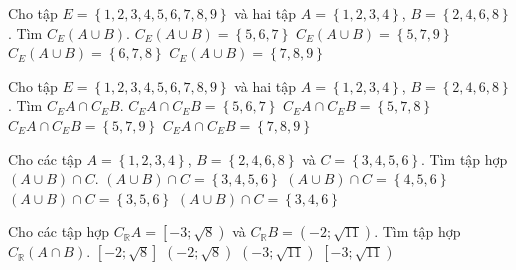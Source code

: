 \begin{ex}%
	Cho tập $E=\left\{1,2,3,4,5,6,7,8,9\right\}$ và hai tập $A=\left\{1,2,3,4\right\}$, $B=\left\{2,4,6,8\right\}$. Tìm $C_E \left(A\cup B\right)$.
	\choice
	{$C_E \left(A\cup B\right)=\left\{5,6,7\right\} $}
	{\True$C_E \left(A\cup B\right)=\left\{5,7,9\right\} $}
	{$C_E \left(A\cup B\right)=\left\{6,7,8\right\} $}
	{$C_E \left(A\cup B\right)=\left\{7,8,9\right\} $}
\end{ex}

\begin{ex}%
	Cho tập $E=\left\{1,2,3,4,5,6,7,8,9\right\}$ và hai tập $A=\left\{1,2,3,4\right\}$, $B=\left\{2,4,6,8\right\}$. Tìm $C_E A\cap C_EB$.	
	\choice
	{$C_E A\cap C_EB=\left\{5,6,7\right\}$}
	{$C_E A\cap C_EB=\left\{5,7,8\right\}$}
	{\True$C_E A\cap C_EB=\left\{5,7,9\right\}$}
	{$C_E A\cap C_EB=\left\{7,8,9\right\}$}
\end{ex}

\begin{ex}%
	Cho các tập $A=\left\{1,2,3,4\right\}$, $B=\left\{2,4,6,8\right\}$ và $C=\left\{3,4,5,6\right\}$. Tìm tập hợp $\left(A\cup B\right)\cap C$.
	\choice
	{$\left(A\cup B\right)\cap C=\left\{3,4,5,6\right\}$}
	{$\left(A\cup B\right)\cap C=\left\{4,5,6\right\}$}
	{$\left(A\cup B\right)\cap C=\left\{3,5,6\right\}$}
	{\True$\left(A\cup B\right)\cap C=\left\{3,4,6\right\}$}
\end{ex}
\begin{ex}%
	Cho các tập hợp $C_{\mathbb{R}} A =\left[ -3;\sqrt{8} \right)$ và $C_{\mathbb{R}}B =\left(-2;\sqrt{11} \right)$. Tìm tập hợp $C_{\mathbb{R}}\left( A\cap B \right)$.
	\choice
	{$\left[ -2;\sqrt{8} \right]$}
	{$\left( -2;\sqrt{8} \right)$}
	{$\left( -3;\sqrt{11} \right)$}
	{\True $\left[ -3;\sqrt{11} \right)$}
	\loigiai{ 
		Tập hợp $C_{\mathbb{R}} A =\left[ -3;\sqrt{8} \right) \Rightarrow A=\left( -\infty;-3 \right)\cup \left[ {\sqrt{8}; +\infty}\right)$.\\
		Tập hợp $C_{\mathbb{R}}B =\left(-2;\sqrt{11} \right)\Rightarrow B=\left( -\infty;-2 \right]\cup \left[ {\sqrt{11}; +\infty}\right)$.\\
		Tập hợp $A \cap B= \left( -\infty;-3 \right)\cup \left[ {\sqrt{11}; +\infty}\right) \Rightarrow C_{\mathbb{R}}\left( {A \cap B}\right)= \left[ {-3; \sqrt{11}}\right)$.
	}
\end{ex}

